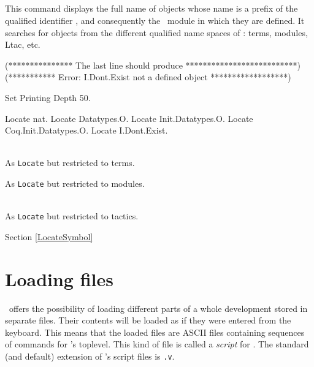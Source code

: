 
\subsection[\tt Locate {\qualid}.]{}
This command displays the full name of objects whose name is a prefix of the
qualified identifier {\qualid}, and consequently the \Coq\ module in which they
are defined. It searches for objects from the different qualified name spaces of
{\Coq}: terms, modules, Ltac, etc.

\begin{coq_eval}
(*************** The last line should produce **************************)
(*********** Error: I.Dont.Exist not a defined object ******************)
\end{coq_eval}
\begin{coq_eval}
Set Printing Depth 50.
\end{coq_eval}
\begin{coq_example}
Locate nat.
Locate Datatypes.O.
Locate Init.Datatypes.O.
Locate Coq.Init.Datatypes.O.
Locate I.Dont.Exist.
\end{coq_example}

\begin{Variants}
\item {}\\
  As {\tt Locate} but restricted to terms.

\item {}
  As {\tt Locate} but restricted to modules.

\item {}\\
  As {\tt Locate} but restricted to tactics.
\end{Variants}


\SeeAlso Section \ref{LocateSymbol}

\section{Loading files}

\Coq\ offers the possibility of loading different
parts of a whole development stored in separate files. Their contents
will be loaded as if they were entered from the keyboard. This means
that the loaded files are ASCII files containing sequences of commands
for \Coq's toplevel. This kind of file is called a {\em script} for
\Coq{}. The standard (and default) extension of
\Coq's script files is {\tt .v}.

